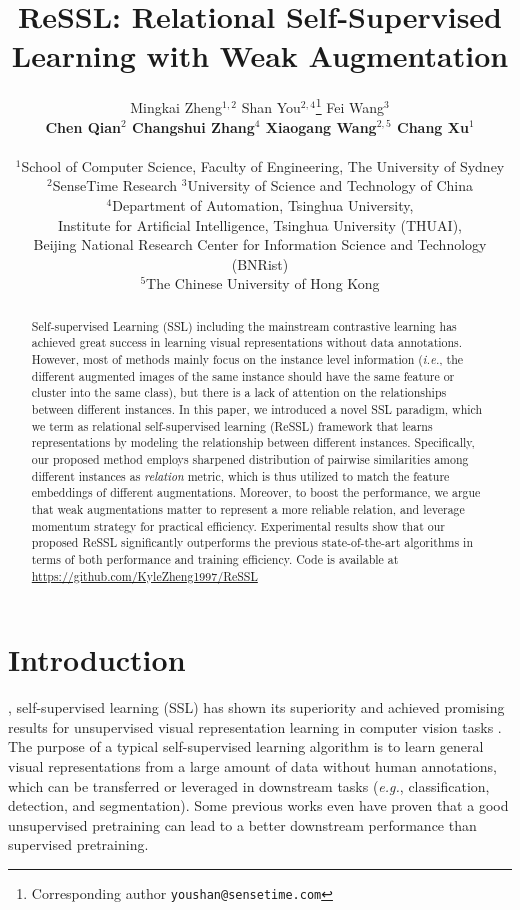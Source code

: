 \documentclass{article}
\title{ReSSL: Relational Self-Supervised Learning with Weak Augmentation}
\author{Mingkai Zheng$^{1,2}$ \quad Shan You$^{2,4}$\thanks{Corresponding author \texttt{youshan@sensetime.com}}  \quad Fei Wang$^3$\\
	 \textbf{Chen Qian$^2$ \quad Changshui Zhang$^{4}$ \quad Xiaogang Wang$^{2,5}$ \quad Chang Xu$^1$}\\
	 ~\\
	 $^1$School of Computer Science, Faculty of Engineering, The University of Sydney\\
	$^2$SenseTime Research \quad $^3$University of Science and Technology of China\\
	 $^{4}$Department of Automation, Tsinghua University,\\
Institute for Artificial Intelligence, Tsinghua University (THUAI), \\
Beijing National Research Center for Information Science and Technology (BNRist)\\
	 $^5$The Chinese University of Hong Kong\\ 
}
\newcommand{\<}{\left\langle}
\renewcommand{\>}{\right\rangle}
\newcommand{\eg}{{\emph{e.g.}}}
\newcommand{\ie}{{\emph{i.e.}}}
\begin{document}
\maketitle

\vspace{-10pt}
\begin{abstract}
\vspace{-10pt}

Self-supervised Learning (SSL) including the mainstream contrastive learning has achieved great success in learning visual representations without data annotations. However, most of methods mainly focus on the instance level information (\ie, the different augmented images of the same instance should have the same feature or cluster into the same class), but there is a lack of attention on the relationships between different instances. In this paper, we introduced a novel SSL paradigm, which we term as relational self-supervised learning  (ReSSL) framework that learns representations by modeling the relationship between different instances. Specifically, our proposed method employs sharpened distribution of pairwise similarities among different instances as \textit{relation} metric, which is thus utilized to match the feature embeddings of different augmentations. Moreover, to boost the performance, we argue that weak augmentations matter to represent a more reliable relation, and leverage momentum strategy for practical efficiency. Experimental results show that our proposed ReSSL significantly outperforms the previous state-of-the-art algorithms in terms of both performance and training efficiency. Code is available at \href{https://github.com/KyleZheng1997/ReSSL}{https://github.com/KyleZheng1997/ReSSL}



\end{abstract}

\ifCLASSOPTIONcompsoc
{}
\else
\section{Introduction}
\label{sec:introduction}
\fi

, self-supervised learning (SSL) has shown its superiority and achieved promising results for unsupervised visual representation learning in computer vision tasks \cite{cmc, deepinfomax, cpc, simclr, SimSiam, instance_discrimination, byol, moco}. The purpose of a typical self-supervised learning algorithm is to learn general visual representations from a large amount of data without human annotations, which can be transferred or leveraged in downstream tasks (\eg, classification, detection, and segmentation). Some previous works \cite{swav, byol} even have proven that a good unsupervised pretraining can lead to a better downstream performance than supervised pretraining.  
\end{document}
